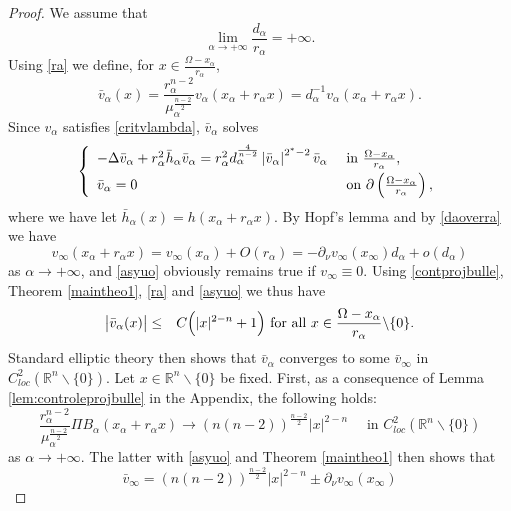 \documentclass[10pt]{amsart}
\numberwithin{equation}{section}
\newcommand{\Om}{\Omega}
\newcommand{\ma}{\mu_\alpha}
\def \rr {\mathbb{R}}
\def \bb{\hbox}
\def \xl{x_\alpha}
\def \ls{+\infty}
\def\la{\alpha}
\def \vb{\bar{v}_{\alpha}}
\def \ma{\mu_{\alpha}}
\def \va{v_{\alpha}}
\def \vo {v_{\infty}}
\def \xin{x_{\infty}}
\def \ra{r_{\alpha}}
\def \hb{\bar{h}_{\alpha}}
\theoremstyle{plain}
\theoremstyle{remark}
\begin{document}
\begin{proof}
We assume that 
\begin{equation}\label{daoverra}
\lim_{\la\to\ls} \frac{d_{\la}}{r_{\la}}=+\infty.
\end{equation}
Using \eqref{ra} we define, for $x \in \frac{\Om-\xl}{r_{\la}}$, 
\begin{equation}\label{vb1}
\vb(x)=\frac{r_\alpha^{n-2}}{\ma^{\frac{n-2}{2}}}\va(\xl+r_{\la}x) = d_{\la}^{-1}\va(\xl+r_{\la}x). 
\end{equation}
Since $\va$ satisfies \eqref{critvlambda}, $\vb$ solves 
\begin{equation*}
	\left\{\begin{array}{ll}
\vspace{0.1cm}		-\Delta\vb +r_{\la}^2\hb \vb=r_{\la}^2 d_{\la}^{\frac{4}{n-2}} \left|\vb\right|^{2^*-2}\vb &\hbox{ in } \frac{\Om-\xl}{r_{\la}}, \\
		\vb= 0  &\hbox{ on } \partial\left(  \frac{\Om-\xl}{r_{\la}}\right),
	\end{array}\right.
\end{equation*}
where we have let $\hb(x)=h(\xl+\ra x)$. By Hopf's lemma and by \eqref{daoverra} we have 
\begin{equation} \label{asyuo}
	\vo(\xl+r_{\la}x)= \vo(\xl) + O(r_\alpha) = -\partial_{\nu}\vo(\xin)d_{\alpha}+o(d_{\alpha}) 
	\end{equation}
as $\alpha \to +\infty$, and \eqref{asyuo} obviously remains true if $\vo \equiv 0$. Using \eqref{contprojbulle}, Theorem \ref{maintheo1}, \eqref{ra} and \eqref{asyuo} we thus have
\begin{eqnarray*}\label{estva1}
	\big|\vb(x) \big|&\leq	&C \Big( |x|^{2-n}+ 1 \Big) \bb{ for all }x\in \frac{\Om-\xl}{r_{\la}}\backslash\{0\}.
\end{eqnarray*}
Standard elliptic theory then shows that $\vb$ converges to some $\bar{v}_\infty$ in $C^2_{loc}(\rr^n\backslash\{0\})$. Let $x \in \rr^n\backslash\{0\}$ be fixed. First, as a consequence of Lemma \ref{lem:controleprojbulle} in the Appendix, the following holds: 
\begin{equation*} 
\frac{r_\alpha^{n-2}}{\ma^{\frac{n-2}{2}}} \Pi B_\alpha(\xl+r_{\la}x)  \to (n(n-2))^{\frac{n-2}{2}}|x|^{2-n} \quad \text{ in } C^2_{loc} (\rr^n\backslash\{0\}) 
  \end{equation*}
as $\alpha \to + \infty$. The latter with \eqref{asyuo} and Theorem \ref{maintheo1} then shows that 
 \begin{equation}\label{convba}
\bar{v}_\infty= (n(n-2))^{\frac{n-2}{2}}|x|^{2-n} \pm \partial_{\nu}\vo(\xin) 

\end{equation}
\end{proof}
\end{document}

